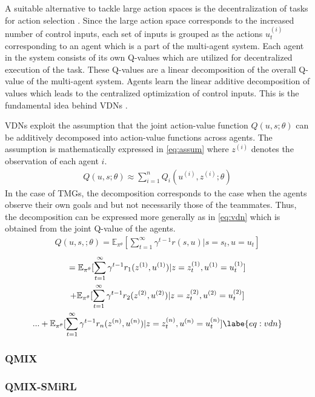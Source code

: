 \documentclass{article}
\begin{document}
\begin{multicols}{2}
A suitable alternative to tackle large action spaces is the decentralization of tasks for action selection \cite{vdn}. Since the large action space corresponds to the increased number of control inputs, each set of inputs is grouped as the actions $u_{t}^{(i)}$ corresponding to an agent which is a part of the multi-agent system. Each agent in the system consists of its own Q-values which are utilized for decentralized execution of the task. These Q-values are a linear decomposition of the overall Q-value of the multi-agent system. Agents learn the linear additive decomposition of values which leads to the centralized optimization of control inputs. This is the fundamental idea behind VDNs \cite{vdn}.

VDNs exploit the assumption that the joint action-value function $Q(u,s;\theta)$ can be additively decomposed into action-value functions across agents. The assumption is mathematically expressed in \autoref{eq:assum} where $z^{(i)}$ denotes the observation of each agent $i$.
\begin{gather}
  Q(u,s;\theta) \approx \sum_{i=1}^{n}Q_{i}(u^{(i)},z^{(i)};\theta)\label{eq:assum}
\end{gather}
In the case of TMGs, the decomposition corresponds to the case when the agents observe their own goals and but not necessarily those of the teammates. Thus, the decomposition can be expressed more generally as in \autoref{eq:vdn} which is obtained from the joint Q-value of the agents.
\begin{gather}
  Q(u,s,;\theta) = \mathbb{E}_{\pi^{\theta}}[\sum_{t=1}^{\infty}\gamma^{t-1}r(s,u)|s=s_{t}, u=u_{t}] \nonumber
\end{gather}
\begin{multline}
  = \mathbb{E}_{\pi^{\theta}}[\sum_{t=1}^{\infty}\gamma^{t-1}r_{1}(z^{(1)},u^{(1)})|z=z^{(1)}_{t}, u^{(1)}=u^{(1)}_{t}]\\ + \mathbb{E}_{\pi^{\theta}}[\sum_{t=1}^{\infty}\gamma^{t-1}r_{2}(z^{(2)},u^{(2)})|z=z^{(2)}_{t}, u^{(2)}=u^{(2)}_{t}]\\ ... +\mathbb{E}_{\pi^{\theta}}[\sum_{t=1}^{\infty}\gamma^{t-1}r_{n}(z^{(n)},u^{(n)})|z=z^{(n)}_{t}, u^{(n)}=u^{(n)}_{t}] \labe{eq:vdn}
\end{multline}

\subsubsection{QMIX}

\subsubsection{QMIX-SMiRL}



\end{multicols}
\end{document}
